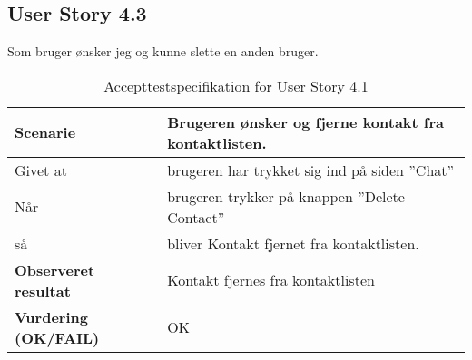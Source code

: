 \subsection{User Story 4.3}
Som bruger ønsker jeg og kunne slette en anden bruger.

\begin{table}[H]
	\centering
	\caption{Accepttestspecifikation for User Story 4.1 }
	\begin{tabular}{p{8cm}|p{8cm}}
		\hline
		\textbf{Scenarie} & Brugeren ønsker og fjerne kontakt fra kontaktlisten.\\[10px]
		\hline
        Givet at & brugeren har trykket sig ind på siden ''Chat''\\
        \hline
        Når & brugeren trykker på knappen ''Delete Contact''\\
        \hline
        så & bliver Kontakt fjernet fra kontaktlisten.\\
		\hline
		\rowcolor{white}
		\textbf{Observeret resultat} & Kontakt fjernes fra kontaktlisten\\
		\hline
		\textbf{Vurdering (OK/FAIL)} & OK\\
		\hline
	\end{tabular}
\end{table}